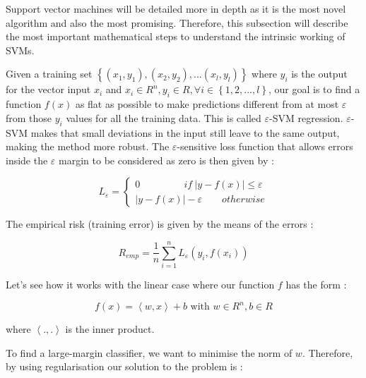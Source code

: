 \documentclass[11pt,a4paper,oneside]{book}
\begin{document}
Support vector machines will be detailed more in depth as it is the most novel algorithm and also the most promising. Therefore, this subsection will describe the most important mathematical steps to understand the intrinsic working of SVMs.

Given a training set $\left \{ \left ( x_{1}, y_{1} \right ), \left ( x_{2}, y_{2} \right ), ... \left ( x_{l}, y_{l} \right ) \right \}$ where $y_{i}$ is the output for the vector input $x_{i}$ and $x_{i} \in R^{n} , y_{i} \in R,  \forall i \in \left \{ 1,2, ...,l \right \}$, our goal is to find a function $f\left ( x \right )$ as flat as possible to make predictions different from at most $\varepsilon$ from those $y_{i}$ values for all the training data. This is called $\varepsilon$-SVM regression. $\varepsilon$-SVM makes that small deviations in the input still leave to the same output, making the method more robust. The $\varepsilon$-sensitive loss function that allows errors inside the $\varepsilon$ margin to be considered as zero is then given by :

\begin{equation}
L_{\varepsilon} = \left\{\begin{matrix}
0 \qquad\qquad\ \   if \ \left | y - f\left ( x \right )\right | \leq \varepsilon \\ 
\left | y - f\left ( x \right )\right | - \varepsilon \qquad otherwise
\end{matrix}\right.
\end{equation} \cite{Cortes}\cite{Smola} 

The empirical risk (training error) is given by the means of the errors :

\begin{equation}
R_{emp} = \frac{1}{n} \sum_{i=1}^n L_{\varepsilon}\left ( y_{i}, f\left ( x_{i} \right ) \right )
\end{equation}

Let's see how it works with the linear case where our function $f$ has the form :

\begin{equation}
f\left ( x \right ) = \left \langle w, x \right \rangle + b  \text{ with } w \in R^{n}, b \in R
\end{equation}

where $\left \langle ., . \right \rangle$ is the inner product.

To find a large-margin classifier, we want to minimise the norm of $w$. Therefore, by using regularisation our solution to the problem is :
\end{document}
